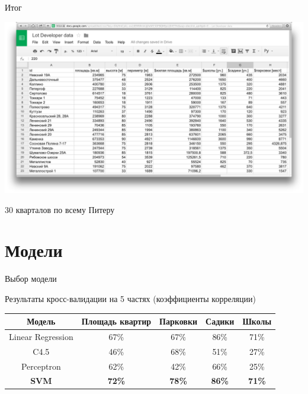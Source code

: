 \documentclass[14pt, fleqn, xcolor={dvipsnames, table}]{beamer}
\begin{document}
        \begin{frame}{Итог}
            \begin{center}
                \includegraphics[scale=0.20]{data.png}
                
                30 кварталов по всему Питеру
            \end{center} 
        \end{frame}
        
    \section{Модели}          
        
        \begin{frame}{Выбор модели}
        
            Результаты кросс-валидации на 5 частях (коэффициенты корреляции)
            \begin{footnotesize}
            \begin{table} 
		        \begin{tabular} {| c | c | c | c | c |}
				    \hline
				    Модель    &    Площадь квартир   &    Парковки    &    Садики    &    Школы   \\
				    \hline
				    Linear Regression    &    67\%    &    67\%    &    86\%    &    71\%    \\		
				    C4.5    &    46\%    &    68\%    &    51\%    &    27\%    \\
				    Perceptron    &    62\%    &    42\%    &   66\%    &    25\%    \\
				    \bf{SVM}    &    \bf{72\%}    &    \bf{78\%}    &   \bf{86\%}    &    \bf{71\%}    \\
				    \hline
			    \end{tabular}
		    \end{table}  
            \end{footnotesize}
        \end{frame}
        
\end{document}
